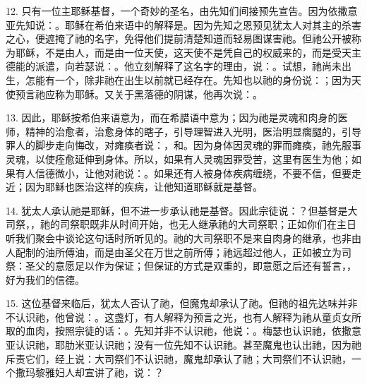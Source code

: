12. 只有一位主耶稣基督，一个奇妙的圣名，由先知们间接预先宣告。因为依撒意亚先知说：。耶稣在希伯来语中的解释是。因为先知之恩预见犹太人对其主的杀害之心，便遮掩了祂的名字，免得他们提前清楚知道而轻易图谋害祂。但祂公开被称为耶稣，不是由人，而是由一位天使，这天使不是凭自己的权威来的，而是受天主德能的派遣，向若瑟说：。他立刻解释了这名字的理由，说：。试想，祂尚未出生，怎能有一个，除非祂在出生以前就已经存在。先知也以祂的身份说：；因为天使预言祂应称为耶稣。又关于黑落德的阴谋，他再次说：。\par

13. 因此，耶稣按希伯来语意为，而在希腊语中意为；因为祂是灵魂和肉身的医师，精神的治愈者，治愈身体的瞎子，引导理智进入光明，医治明显瘸腿的，引导罪人的脚步走向悔改，对瘫痪者说：，和。因为身体因灵魂的罪而瘫痪，祂先服事灵魂，以使痊愈延伸到身体。所以，如果有人灵魂因罪受苦，这里有医生为他；如果有人信德微小，让他对祂说：。如果还有人被身体疾病缠绕，不要不信，但要走近；因为耶稣也医治这样的疾病，让他知道耶稣就是基督。\par

14. 犹太人承认祂是耶稣，但不进一步承认祂是基督。因此宗徒说：？但基督是大司祭，，祂的司祭职既非从时间开始，也无人继承祂的大司祭职；正如你们在主日听我们聚会中谈论这句话时所听见的。祂的大司祭职不是来自肉身的继承，也非由人配制的油所傅油，而是由圣父在万世之前所傅；祂远超过他人，正如被立为司祭：圣父的意愿足以作为保证；但保证的方式是双重的，即意愿之后还有誓言，，好为我们的信德。\par

15. 这位基督来临后，犹太人否认了祂，但魔鬼却承认了祂。但祂的祖先达味并非不认识祂，他曾说：。这盏灯，有人解释为预言之光，也有人解释为祂从童贞女所取的血肉，按照宗徒的话：。先知并非不认识祂，他说：。梅瑟也认识祂，依撒意亚认识祂，耶肋米亚认识祂；没有一位先知不认识祂。甚至魔鬼也认出祂，因为祂斥责它们，经上说：大司祭们不认识祂，魔鬼却承认了祂；大司祭们不认识祂，一个撒玛黎雅妇人却宣讲了祂，说：？\par

